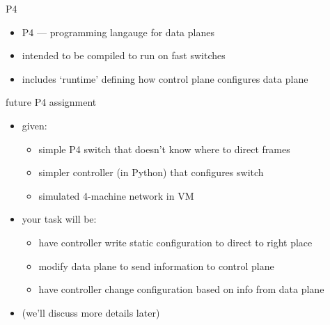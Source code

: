 \usetikzlibrary{arrows.meta,decorations.pathreplacing}

\begin{frame}{P4}
    \begin{itemize}
    \item P4 --- programming langauge for data planes
    \item intended to be compiled to run on fast switches
    \item includes `runtime' defining how control plane configures data plane
    \end{itemize}
\end{frame}

\begin{frame}{future P4 assignment}
    \begin{itemize}
    \item given: 
        \begin{itemize}
        \item simple P4 switch that doesn't know where to direct frames
        \item simpler controller (in Python) that configures switch
        \item simulated 4-machine network in VM
        \end{itemize}
    \item your task will be:
        \begin{itemize}
        \item have controller write static configuration to direct to right place
        \item modify data plane to send information to control plane
        \item have controller change configuration based on info from data plane
        \end{itemize}
    \item (we'll discuss more details later)
    \end{itemize}
\end{frame}

